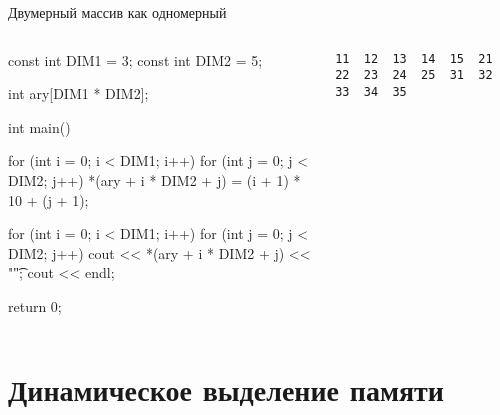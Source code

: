 \documentclass[
    9pt,
    hyperref={pdfencoding=unicode}
    ]{beamer}
\theoremstyle{definition}
\begin{document}
\begin{frame}[fragile]{Двумерный массив как одномерный}
    \footnotesize
    \begin{columns}
        \begin{column}{0.7\textwidth}
            \begin{cppcode}
                const int DIM1 = 3;
                const int DIM2 = 5;
                
                int ary[DIM1 * DIM2];
                
                int main() {
                    
                    for (int i = 0; i < DIM1; i++) {
                        for (int j = 0; j < DIM2; j++) {
                            *(ary + i * DIM2 + j) = (i + 1) * 10 + (j + 1);
                        }
                    }
                    
                    for (int i = 0; i < DIM1; i++) {
                        for (int j = 0; j < DIM2; j++) {
                            cout << *(ary + i * DIM2 + j) << "\t";
                        }
                        cout << endl;
                    }
                    
                    return 0;
                }
            \end{cppcode}
        \end{column}
        \begin{column}{0.3\textwidth}
            \begin{verbatim}
11  12  13  14  15  21  22  23  24  25  31  32  33  34  35
            \end{verbatim}
        \end{column}
    \end{columns}
    
\end{frame}

\section{Динамическое выделение памяти}
\end{document}
